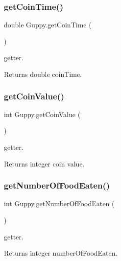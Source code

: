 \subsubsection{\texorpdfstring{get\+Coin\+Time()}{getCoinTime()}}
{\footnotesize\ttfamily double Guppy.\+get\+Coin\+Time (\begin{DoxyParamCaption}{ }\end{DoxyParamCaption})\hspace{0.3cm}{\ttfamily [inline]}}

getter. \begin{DoxyReturn}{Returns}
double coin\+Time. 
\end{DoxyReturn}
\mbox{\label{class_guppy_a05b113a4bac22e8214a671da03b52294}} 
\subsubsection{\texorpdfstring{get\+Coin\+Value()}{getCoinValue()}}
{\footnotesize\ttfamily int Guppy.\+get\+Coin\+Value (\begin{DoxyParamCaption}{ }\end{DoxyParamCaption})\hspace{0.3cm}{\ttfamily [inline]}}

getter. \begin{DoxyReturn}{Returns}
integer coin value. 
\end{DoxyReturn}
\mbox{\label{class_guppy_a1b4fd13a880aa51ad21dd2357e5aaa2b}} 
\subsubsection{\texorpdfstring{get\+Number\+Of\+Food\+Eaten()}{getNumberOfFoodEaten()}}
{\footnotesize\ttfamily int Guppy.\+get\+Number\+Of\+Food\+Eaten (\begin{DoxyParamCaption}{ }\end{DoxyParamCaption})\hspace{0.3cm}{\ttfamily [inline]}}

getter. \begin{DoxyReturn}{Returns}
integer number\+Of\+Food\+Eaten. 
\end{DoxyReturn}
\mbox{\label{class_guppy_a14ca9e79a2fe085224f240e496c9905e}} 
